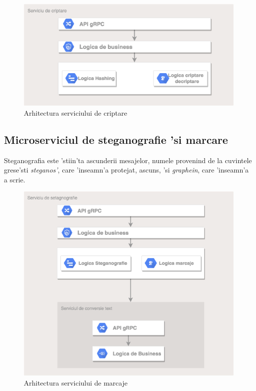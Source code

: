 \documentclass[12pt,a4paper,twoside]{report}
\begin{document}
\begin{figure}[H]
\begin{center}
\advance\leftskip-3cm
\advance\rightskip-3cm
\includegraphics[keepaspectratio=true,scale=0.55]{img/crypto_arch.png}
\caption{Arhitectura serviciului de criptare}
\label{crypto_arch}
\end{center}
\end{figure}


\subsection{Microserviciul de steganografie 'si marcare}  \label{s_watermarking}

Steganografia este 'stiin'ta ascunderii mesajelor, numele provenind de la cuvintele grese'sti \textit{steganos'}, care 'inseamn'a protejat, ascuns, 'si \textit{graphein}, care 'inseamn'a a scrie.

\begin{figure}[H]
\begin{center}
\advance\leftskip-3cm
\advance\rightskip-3cm
\includegraphics[keepaspectratio=true,scale=0.55]{img/watermarking_arch.png}
\caption{Arhitectura serviciului de marcaje}
\label{water_arch}
\end{center}
\end{figure}
\end{document}
